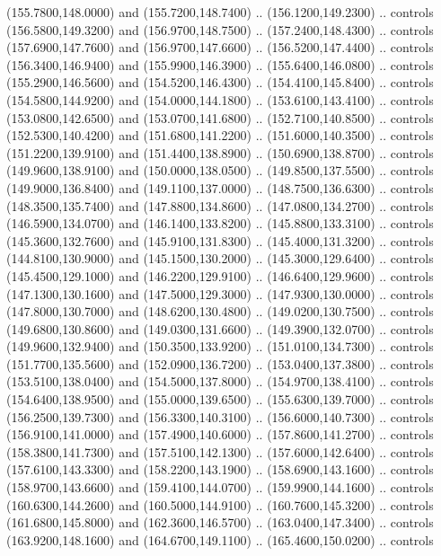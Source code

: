 {\begin{scope}[y=0.80pt, x=0.80pt, yscale=-1, xscale=1, inner sep=0pt, outer sep=0pt, #1]
      (155.7800,148.0000) and (155.7200,148.7400) .. (156.1200,149.2300) .. controls
      (156.5800,149.3200) and (156.9700,148.7500) .. (157.2400,148.4300) .. controls
      (157.6900,147.7600) and (156.9700,147.6600) .. (156.5200,147.4400) .. controls
      (156.3400,146.9400) and (155.9900,146.3900) .. (155.6400,146.0800) .. controls
      (155.2900,146.5600) and (154.5200,146.4300) .. (154.4100,145.8400) .. controls
      (154.5800,144.9200) and (154.0000,144.1800) .. (153.6100,143.4100) .. controls
      (153.0800,142.6500) and (153.0700,141.6800) .. (152.7100,140.8500) .. controls
      (152.5300,140.4200) and (151.6800,141.2200) .. (151.6000,140.3500) .. controls
      (151.2200,139.9100) and (151.4400,138.8900) .. (150.6900,138.8700) .. controls
      (149.9600,138.9100) and (150.0000,138.0500) .. (149.8500,137.5500) .. controls
      (149.9000,136.8400) and (149.1100,137.0000) .. (148.7500,136.6300) .. controls
      (148.3500,135.7400) and (147.8800,134.8600) .. (147.0800,134.2700) .. controls
      (146.5900,134.0700) and (146.1400,133.8200) .. (145.8800,133.3100) .. controls
      (145.3600,132.7600) and (145.9100,131.8300) .. (145.4000,131.3200) .. controls
      (144.8100,130.9000) and (145.1500,130.2000) .. (145.3000,129.6400) .. controls
      (145.4500,129.1000) and (146.2200,129.9100) .. (146.6400,129.9600) .. controls
      (147.1300,130.1600) and (147.5000,129.3000) .. (147.9300,130.0000) .. controls
      (147.8000,130.7000) and (148.6200,130.4800) .. (149.0200,130.7500) .. controls
      (149.6800,130.8600) and (149.0300,131.6600) .. (149.3900,132.0700) .. controls
      (149.9600,132.9400) and (150.3500,133.9200) .. (151.0100,134.7300) .. controls
      (151.7700,135.5600) and (152.0900,136.7200) .. (153.0400,137.3800) .. controls
      (153.5100,138.0400) and (154.5000,137.8000) .. (154.9700,138.4100) .. controls
      (154.6400,138.9500) and (155.0000,139.6500) .. (155.6300,139.7000) .. controls
      (156.2500,139.7300) and (156.3300,140.3100) .. (156.6000,140.7300) .. controls
      (156.9100,141.0000) and (157.4900,140.6000) .. (157.8600,141.2700) .. controls
      (158.3800,141.7300) and (157.5100,142.1300) .. (157.6000,142.6400) .. controls
      (157.6100,143.3300) and (158.2200,143.1900) .. (158.6900,143.1600) .. controls
      (158.9700,143.6600) and (159.4100,144.0700) .. (159.9900,144.1600) .. controls
      (160.6300,144.2600) and (160.5000,144.9100) .. (160.7600,145.3200) .. controls
      (161.6800,145.8000) and (162.3600,146.5700) .. (163.0400,147.3400) .. controls
      (163.9200,148.1600) and (164.6700,149.1100) .. (165.4600,150.0200) .. controls

\end{scope}}
